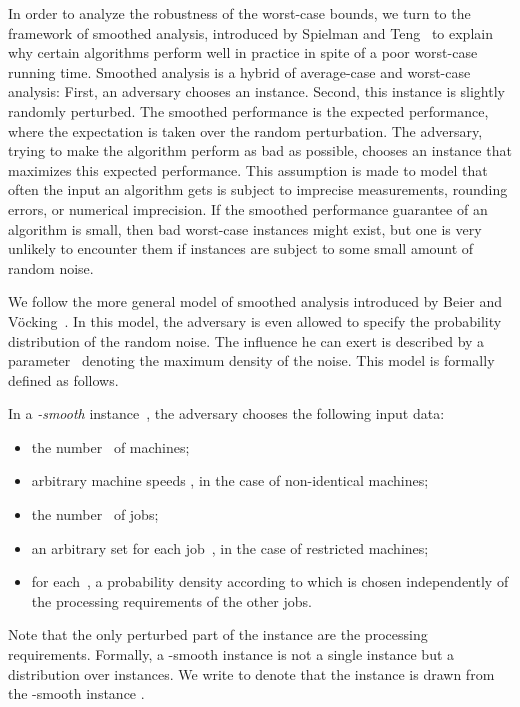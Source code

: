\documentclass[a4paper,11pt,fleqn]{article}
\begin{document}
In order to analyze the robustness of the worst-case bounds, we turn to the
framework of smoothed analysis, introduced by Spielman and
Teng~\cite{Spielman+Teng:SA:2004} to explain why certain algorithms perform
well in practice in spite of a poor worst-case running time. Smoothed analysis is a hybrid of
average-case and worst-case analysis: First, an adversary chooses an instance.
Second, this instance is slightly randomly perturbed. The smoothed performance
is the expected performance, where the expectation is taken over the random
perturbation. The adversary, trying to make the algorithm perform as bad as
possible, chooses an instance that maximizes this expected performance. This
assumption is made to model that often the input an algorithm gets is subject to
imprecise measurements, rounding errors, or numerical imprecision.
If the smoothed performance guarantee of an algorithm is small, then bad worst-case
instances might exist, but one is very unlikely to encounter them if instances are
subject to some small amount of random noise. 

We follow the more general model of smoothed analysis introduced by Beier and
V\"{o}cking~\cite{DBLP:journals/jcss/BeierV04}.
In this model, the adversary is even allowed to
specify the probability distribution of the random noise. The influence he can
exert is described by a parameter~ denoting the maximum density of the noise. This model is formally defined as follows.
\begin{definition}
\label{def:phi-smooth}
In a \emph{-smooth} instance~,
the adversary chooses the following input data:
\begin{itemize}
\item the number~ of machines;
\item arbitrary machine speeds ,
in the case of non-identical machines;
\item the number~ of jobs;
\item an arbitrary set  for each job~,
in the case of restricted machines;
\item for each~, a probability density  according
to which  is chosen independently of the processing requirements of the other jobs.
\end{itemize}
Note that the only perturbed part of the instance are the processing
requirements.
Formally, a -smooth instance is not a single instance but a
distribution over instances.
We write  to denote that the instance  is
drawn from the -smooth instance .
\end{definition}
\end{document}
